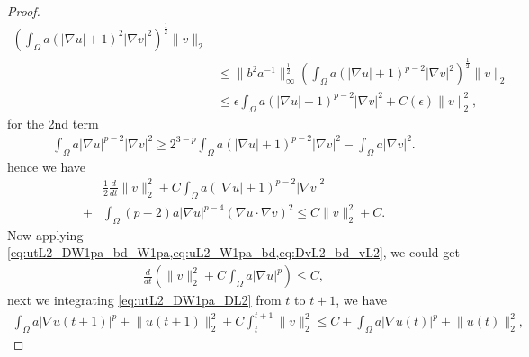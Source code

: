 \documentclass[11pt]{amsart}
\theoremstyle{definition}
\numberwithin{equation}{section}
\newcommand*\abs[1]{\lvert#1\rvert}
\newcommand*\norm[1]{\lVert#1\rVert}
\begin{document}
\begin{proof}
\begin{equation}
\begin{split}
			\left(\int_{\Omega}a\left(\abs{\nabla u}+1\right)^2\abs{\nabla v}^2\right)^{\frac{1}{2}}\norm{v}_2\\
			&\leq \norm{b^2 a^{-1}}_{\infty}^{\frac{1}{2}}
			\left(\int_{\Omega}a\left(\abs{\nabla u}+1\right)^{p-2}\abs{\nabla v}^2\right)^{\frac{1}{2}}\norm{v}_2\\
			&\leq \epsilon \int_{\Omega}a\left(\abs{\nabla u}+1\right)^{p-2}\abs{\nabla v}^2
			+ C(\epsilon) \norm{v}_2^2,
		\end{split}
	\end{equation}
	for the 2nd term
	\begin{equation}
		\begin{split}
			\int_{\Omega}a\abs{\nabla u}^{p-2}\abs{\nabla v}^2
			\geq 2^{3-p}\int_{\Omega}a\left(\abs{\nabla u}+1\right)^{p-2}\abs{\nabla v}^2
			- \int_{\Omega}a\abs{\nabla v}^2.
		\end{split}
	\end{equation}
	hence we have
	\begin{equation}\label{eq:DvL2_bd_vL2}
		\begin{split}
			& \frac{1}{2}\frac{d}{dt}\norm{v}_2^2
			+ C\int_{\Omega}a\left(\abs{\nabla u}+1\right)^{p-2}\abs{\nabla v}^2\\
			+{} & \int_{\Omega}\left(p-2\right)a\abs{\nabla u}^{p-4}\left(\nabla u
			\cdot \nabla v\right)^2
			\leq C\norm{v}_2^2 + C.
		\end{split}
	\end{equation}
	Now applying \cref{eq:utL2_DW1pa_bd_W1pa,eq:uL2_W1pa_bd,eq:DvL2_bd_vL2},
	we could get
	\begin{equation}
		\begin{split}
			\frac{d}{dt}\left(
			\norm{v}_2^2 + C\int_{\Omega}a\abs{\nabla u}^p
			\right)
			\leq C,
		\end{split}
	\end{equation}
	next we integrating \cref{eq:utL2_DW1pa_DL2} from $t$ to $t+1$, we have
	\begin{equation}
		\begin{split}
			\int_{\Omega}a\abs{\nabla u(t+1)}^p
			+ \norm{u(t+1)}_2^2
			+ C\int_t^{t+1}\norm{v}_2^2
			\leq C + \int_{\Omega}a\abs{\nabla u(t)}^p
			+ \norm{u(t)}_2^2,
		\end{split}

\end{equation}
\end{proof}
\end{document}

